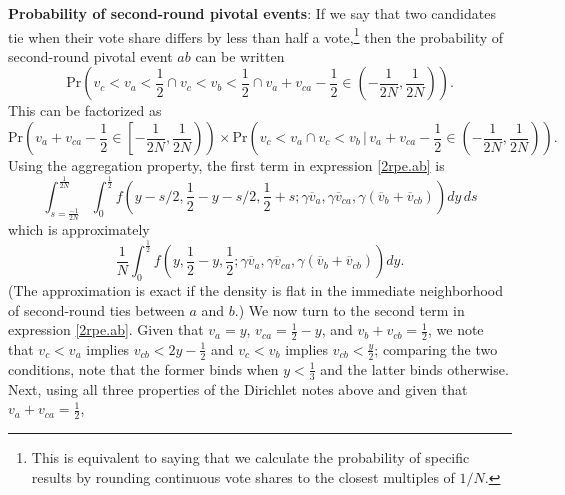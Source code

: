 \documentclass[11pt,a4paper]{article}
\begin{document}
\noindent \textbf{Probability of second-round pivotal events}: 
If we say that two candidates tie when their vote share differs by less than half a vote,\footnote{This is equivalent to saying that we calculate the probability of specific results by rounding continuous vote shares to the closest multiples of $1/N$.} 
then the probability of second-round pivotal event $ab$ can be written 
\begin{equation}   \text{Pr}\left( v_c < v_a < \frac{1}{2}  \cap   v_c < v_b < \frac{1}{2} \cap v_a + v_{ca} - \frac{1}{2} \in \left(-\frac{1}{2N}, \frac{1}{2N} \right) \right).  \nonumber \end{equation} This can be factorized as  
\begin{equation}  \text{Pr}\left(v_a + v_{ca} - \frac{1}{2} \in \left[-\frac{1}{2N}, \frac{1}{2N}\right) \right) \times \text{Pr}\left( v_c < v_a  \cap   v_c < v_b  \, \bigg| \, v_a + v_{ca} - \frac{1}{2} \in \left(-\frac{1}{2N}, \frac{1}{2N} \right) \right).  \label{2rpe.ab} \end{equation}
Using the aggregation property, the first term in expression \ref{2rpe.ab} is
\[ \int_{s = \frac{-1}{2N}}^{\frac{1}{2N}} \int_0^{\frac{1}{2}} f\left(y - s/2, \frac{1}{2} - y - s/2, \frac{1}{2} + s; \gamma \overline{v}_a, \gamma \overline{v}_{ca}, \gamma (\overline{v}_b  + \overline{v}_{cb}) \right) dy \, ds\]
which is approximately 
\[  \frac{1}{N} \int_0^{\frac{1}{2}} f\left(y, \frac{1}{2} - y, \frac{1}{2}; \gamma \overline{v}_a, \gamma \overline{v}_{ca}, \gamma (\overline{v}_b  + \overline{v}_{cb}) \right) dy.\]
(The approximation is exact if the density is flat in the immediate neighborhood of second-round ties between $a$ and $b$.) 
We now turn to the second term in expression \ref{2rpe.ab}. Given that $v_a = y$, $v_{ca} = \frac{1}{2} - y$, and $v_b + v_{cb} = \frac{1}{2}$, we note that $v_c < v_a$ implies $v_{cb} < 2y - \frac{1}{2}$ and $v_c < v_b$ implies $v_{cb} < \frac{y}{2}$; comparing the two conditions, note that the former binds when $y < \frac{1}{3}$ and the latter binds otherwise. Next, using all three properties of the Dirichlet notes above and given that $v_a + v_{ca} = \frac{1}{2}$,  
\end{document}
